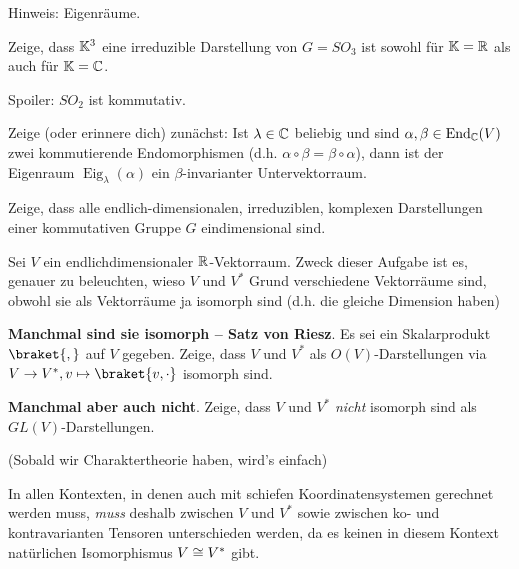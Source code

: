 \begin{sheet}
\begin{problem}[title={Kanonische Darstellung von $SO_2$}]
\begin{subproblem}
Hinweis: Eigenräume.
\end{subproblem}
\end{problem}

\begin{problem}[title={Die kanonische Darstellung von $SO_3$ ist irreduzibel}]\label{ex:fundamentaldarstellung_von_so3}
Zeige, dass $\mathbb{K}^3$ eine irreduzible Darstellung von $G=SO_3$ ist sowohl für $\mathbb{K}=\mathbb{R}$ als auch für $\mathbb{K}=\mathbb{C}$.
\end{problem}

\begin{problem}[title={Was geht bei $SO_2$ schief?}]
Spoiler: $SO_2$ ist kommutativ.

\begin{subproblem}
Zeige (oder erinnere dich) zunächst: Ist $\lambda\in\mathbb{C}$ beliebig und sind $\alpha,\beta\in\operatorname{End}_{\mathbb{C}}(V)$ zwei kommutierende Endomorphismen (d.h. $\alpha\circ\beta=\beta\circ\alpha$), dann ist der Eigenraum $\operatorname{Eig}_\lambda(\alpha)$ ein $\beta$-invarianter Untervektorraum.
\end{subproblem}
\begin{subproblem}
Zeige, dass alle endlich-dimensionalen, irreduziblen, komplexen Darstellungen einer kommutativen Gruppe $G$ eindimensional sind.
\end{subproblem}
\end{problem}

\begin{problem}[title={(Nicht-)Isomorphie von $V$ und $V^\ast$}]
Sei $V$ ein endlichdimensionaler $\mathbb{R}$-Vektorraum. Zweck dieser Aufgabe ist es, genauer zu beleuchten, wieso $V$ und $V^\ast$ Grund verschiedene Vektorräume sind, obwohl sie als Vektorräume ja isomorph sind (d.h. die gleiche Dimension haben)
\begin{subproblem}
\textbf{Manchmal sind sie isomorph -- Satz von Riesz}.
Es sei ein Skalarprodukt $\braket{,}$ auf $V$ gegeben. Zeige, dass $V$ und $V^\ast$ als $O(V)$-Darstellungen via $V\to V^\ast, v\mapsto \braket{v,\cdot}$ isomorph sind.
\end{subproblem}
\begin{subproblem}[difficulty={schwerer als man denkt}]
\textbf{Manchmal aber auch nicht}.
Zeige, dass $V$ und $V^\ast$ \emph{nicht} isomorph sind als $GL(V)$-Darstellungen.

(Sobald wir Charaktertheorie haben, wird's einfach)
\end{subproblem}
\end{problem}

\begin{remark}
In allen Kontexten, in denen auch mit schiefen Koordinatensystemen gerechnet werden muss, \emph{muss} deshalb zwischen $V$ und $V^\ast$ sowie zwischen ko- und kontravarianten Tensoren unterschieden werden, da es keinen in diesem Kontext natürlichen Isomorphismus $V\cong V^\ast$ gibt.


\end{remark}
\end{sheet}
